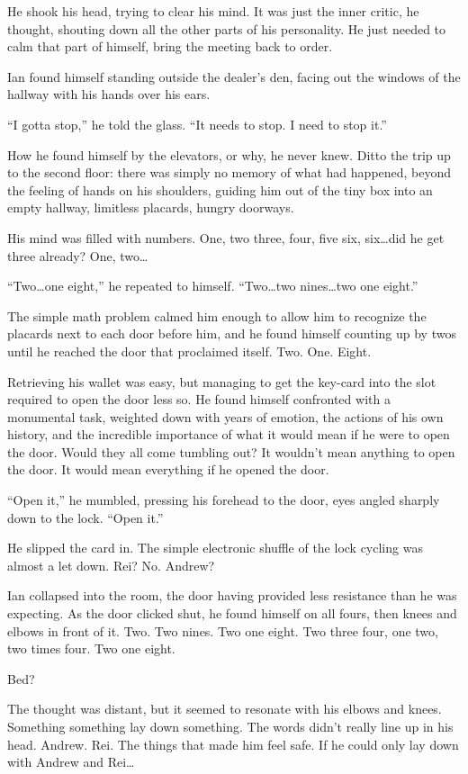 He shook his head, trying to clear his mind.  It was just the inner critic, he thought, shouting down all the other parts of his personality.  He just needed to calm that part of himself, bring the meeting back to order.

Ian found himself standing outside the dealer's den, facing out the windows of the hallway with his hands over his ears.

``I gotta stop,'' he told the glass. ``It needs to stop. I need to stop it.''

How he found himself by the elevators, or why, he never knew. Ditto the trip up to the second floor: there was simply no memory of what had happened, beyond the feeling of hands on his shoulders, guiding him out of the tiny box into an empty hallway, limitless placards, hungry doorways.

His mind was filled with numbers.  One, two three, four, five six, six\ldots{}did he get three already?  One, two\ldots{}

``Two\ldots{}one eight,'' he repeated to himself. ``Two\ldots{}two nines\ldots{}two one eight.''

The simple math problem calmed him enough to allow him to recognize the placards next to each door before him, and he found himself counting up by twos until he reached the door that proclaimed itself. Two. One. Eight.

Retrieving his wallet was easy, but managing to get the key-card into the slot required to open the door less so. He found himself confronted with a monumental task, weighted down with years of emotion, the actions of his own history, and the incredible importance of what it would mean if he were to open the door.  Would they all come tumbling out?  It wouldn't mean anything to open the door.  It would mean everything if he opened the door.

``Open it,'' he mumbled, pressing his forehead to the door, eyes angled sharply down to the lock. ``Open it.''

He slipped the card in. The simple electronic shuffle of the lock cycling was almost a let down. Rei? No. Andrew?

Ian collapsed into the room, the door having provided less resistance than he was expecting. As the door clicked shut, he found himself on all fours, then knees and elbows in front of it. Two. Two nines. Two one eight. Two three four, one two, two times four. Two one eight.

Bed?

The thought was distant, but it seemed to resonate with his elbows and knees. Something something lay down something. The words didn't really line up in his head. Andrew. Rei. The things that made him feel safe. If he could only lay down with Andrew and Rei\ldots{}

